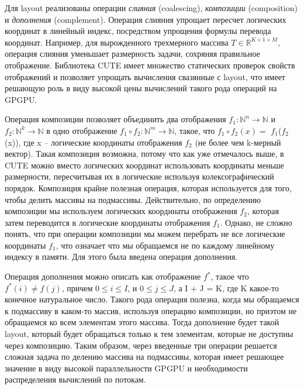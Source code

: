 Для layout реализованы операции \textit{слияния} (coalescing), \textit{композиции} (composition) и \textit{дополнения} (complement).
Операция слияния упрощает пересчет логических координат в линейный индекс, посредством упрощения формулы перевода координат.
Например, для вырожденного трехмерного массива $T \in \mathbb{R}^{K \times 1 \times M}$, операция слияния уменьшает размерность задачи,
сохряняя правильное отображение. Библиотека CUTE имеет множество статических проверок свойств отображений и позволяет упрощать вычисления
свазянные с layout, что имеет решающую роль в виду высокой цены вычислений такого рода операций на GPGPU.

Операция композиции позволяет объединить два отображения $f_1 \colon \mathbb{N}^n \to \mathbb{N}$ и $f_2 \colon \mathbb{N}^k \to \mathbb{N}$
в одно отображение $f_1 \circ f_2 \colon \mathbb{N}^m \to \mathbb{N}$, такое, что $f_1 \circ f_2(x) =$ $f_1$($f_2$(x)), где x -- логические
координаты отображения $f_2$ (не более чем k-мерный вектор). Такая композиция возможна, потому что как уже отмечалось выше, в CUTE можно вместо логических
координат использовать координаты меньше размерности, пересчитывая их в логические используя колексографический порядок. Композиция крайне полезная
операция, которая используется для того, чтобы делить массивы на подмассивы. Действительно, по определению композиции мы используем логических координаты
отображения $f_2$, которая затем переводится в логические координаты отображения $f_1$. Однако, не сложно понять, что при операции композиции мы можем
перебрать не все логические координаты $f_1$, что означает что мы обращаемся не по каждому линейному индексу в памяти. Для этого была введена операция
дополнения.

Операция дополнения можно описать как отображение $f^*$, такое что $f^*(i) \neq f(j)$, причем $0 \leq i \leq I$, и $0 \leq j \leq J$, а I + J = K, где
K какое-то конечное натуральное число. Такого рода операция полезна, когда мы обращаемся к подмассиву в каком-то массив, используя операцию композиции,
но приэтом не обращаемся ко всем элементам этого массива. Тогда дополнение будет такой layout, который будет обращаться только к тем элементам,
которые не доступны через композицию. Таким образом, через введенные три операции решается сложная задача по делению массива на подмассивы,
которая имеет решающее значение в виду высокой параллельности GPGPU и необходимости распределения вычислений по потокам.

